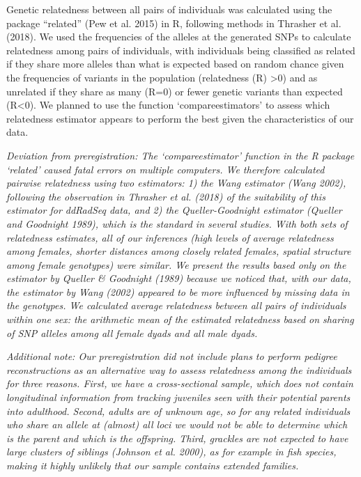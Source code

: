\documentclass[
]{article}
\begin{document}
Genetic relatedness between all pairs of individuals was calculated
using the package ``related'' (Pew et al. 2015) in R, following methods
in Thrasher et al. (2018). We used the frequencies of the alleles at the
generated SNPs to calculate relatedness among pairs of individuals, with
individuals being classified as related if they share more alleles than
what is expected based on random chance given the frequencies of
variants in the population (relatedness (R) \textgreater0) and as
unrelated if they share as many (R=0) or fewer genetic variants than
expected (R\textless0). We planned to use the function
`compareestimators' to assess which relatedness estimator appears to
perform the best given the characteristics of our data.

\emph{Deviation from preregistration: The `compareestimator' function in
the R package `related' caused fatal errors on multiple computers. We
therefore calculated pairwise relatedness using two estimators: 1) the
Wang estimator (Wang 2002), following the observation in Thrasher et al.
(2018) of the suitability of this estimator for ddRadSeq data, and 2)
the Queller-Goodnight estimator (Queller and Goodnight 1989), which is
the standard in several studies. With both sets of relatedness
estimates, all of our inferences (high levels of average relatedness
among females, shorter distances among closely related females, spatial
structure among female genotypes) were similar. We present the results
based only on the estimator by Queller \& Goodnight (1989) because we
noticed that, with our data, the estimator by Wang (2002) appeared to be
more influenced by missing data in the genotypes. We calculated average
relatedness between all pairs of individuals within one sex: the
arithmetic mean of the estimated relatedness based on sharing of SNP
alleles among all female dyads and all male dyads.}

\emph{Additional note: Our preregistration did not include plans to
perform pedigree reconstructions as an alternative way to assess
relatedness among the individuals for three reasons. First, we have a
cross-sectional sample, which does not contain longitudinal information
from tracking juveniles seen with their potential parents into
adulthood. Second, adults are of unknown age, so for any related
individuals who share an allele at (almost) all loci we would not be
able to determine which is the parent and which is the offspring. Third,
grackles are not expected to have large clusters of siblings (Johnson et
al. 2000), as for example in fish species, making it highly unlikely
that our sample contains extended families.}
\end{document}
